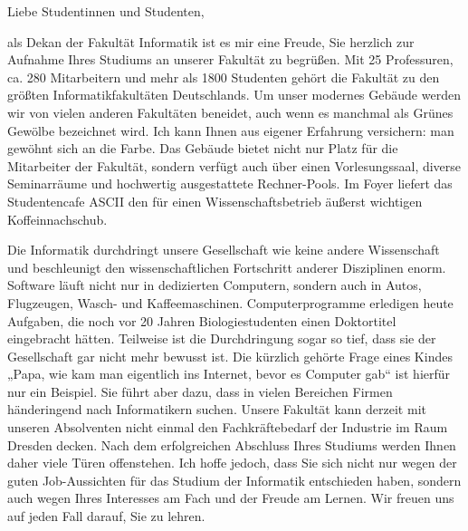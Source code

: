 
Liebe Studentinnen und Studenten,

als Dekan der Fakultät Informatik ist es mir eine Freude, Sie herzlich zur Aufnahme Ihres Studiums an unserer Fakultät zu begrüßen. Mit 25 Professuren, ca. 280 Mitarbeitern und mehr als 1800 Studenten gehört die Fakultät zu den größten Informatikfakultäten Deutschlands. Um unser modernes Gebäude werden wir von vielen anderen Fakultäten beneidet, auch wenn es manchmal als Grünes Gewölbe bezeichnet wird. Ich kann Ihnen aus eigener Erfahrung versichern: man gewöhnt sich an die Farbe. Das Gebäude bietet nicht nur Platz für die Mitarbeiter der Fakultät, sondern verfügt auch über einen Vorlesungssaal, diverse Seminarräume und hochwertig ausgestattete Rechner-Pools. Im Foyer liefert das Studentencafe ASCII den für einen Wissenschaftsbetrieb äußerst wichtigen Koffeinnachschub.

Die Informatik durchdringt unsere Gesellschaft wie keine andere Wissenschaft und beschleunigt den wissenschaftlichen Fortschritt anderer Disziplinen enorm. Software läuft nicht nur in dedizierten Computern, sondern auch in Autos, Flugzeugen, Wasch- und Kaffeemaschinen. Computerprogramme erledigen heute Aufgaben, die noch vor 20 Jahren Biologiestudenten einen Doktortitel eingebracht hätten. Teilweise ist die Durchdringung sogar so tief, dass sie der Gesellschaft gar nicht mehr bewusst ist. Die kürzlich gehörte Frage eines Kindes „Papa, wie kam man eigentlich ins Internet, bevor es Computer gab“ ist hierfür nur ein Beispiel. Sie führt aber dazu, dass in vielen Bereichen Firmen händeringend nach Informatikern suchen. Unsere Fakultät kann derzeit mit unseren Absolventen nicht einmal den Fachkräftebedarf der Industrie im Raum Dresden decken. Nach dem erfolgreichen Abschluss Ihres Studiums werden Ihnen daher viele Türen offenstehen. Ich hoffe jedoch, dass Sie sich nicht nur wegen der guten Job-Aussichten für das Studium der Informatik entschieden haben, sondern auch wegen Ihres Interesses am Fach und der Freude am Lernen. Wir freuen uns auf jeden Fall darauf, Sie zu lehren.

